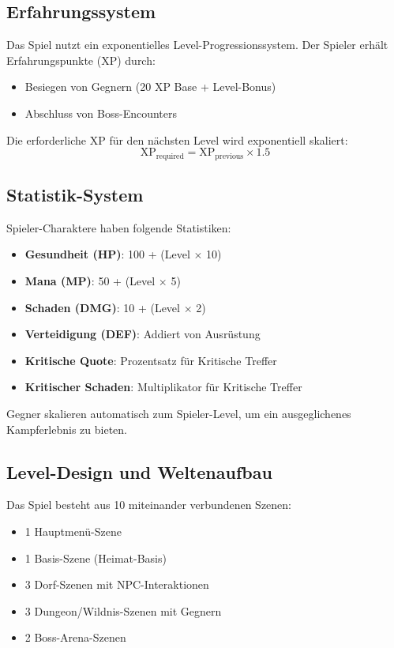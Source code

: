 \documentclass[
  a4paper,
  11pt,
  ngerman,
  parskip=half,
  bibliography=totoc,
  listof=totoc
]{scrreprt}
\begin{document}
\subsection{Erfahrungssystem}

Das Spiel nutzt ein exponentielles Level-Progressionssystem. Der Spieler erhält Erfahrungspunkte (XP) durch:
\begin{itemize}
    \item Besiegen von Gegnern (20 XP Base + Level-Bonus)
    \item Abschluss von Boss-Encounters
\end{itemize}

Die erforderliche XP für den nächsten Level wird exponentiell skaliert:
\begin{equation}
\text{XP}_{\text{required}} = \text{XP}_{\text{previous}} \times 1.5
\end{equation}

\subsection{Statistik-System}

Spieler-Charaktere haben folgende Statistiken:
\begin{itemize}
    \item \textbf{Gesundheit (HP)}: 100 + (Level $\times$ 10)
    \item \textbf{Mana (MP)}: 50 + (Level $\times$ 5)
    \item \textbf{Schaden (DMG)}: 10 + (Level $\times$ 2)
    \item \textbf{Verteidigung (DEF)}: Addiert von Ausrüstung
    \item \textbf{Kritische Quote}: Prozentsatz für Kritische Treffer
    \item \textbf{Kritischer Schaden}: Multiplikator für Kritische Treffer
\end{itemize}

Gegner skalieren automatisch zum Spieler-Level, um ein ausgeglichenes Kampferlebnis zu bieten.

\subsection{Level-Design und Weltenaufbau}

Das Spiel besteht aus 10 miteinander verbundenen Szenen:
\begin{itemize}
    \item 1 Hauptmenü-Szene
    \item 1 Basis-Szene (Heimat-Basis)
    \item 3 Dorf-Szenen mit NPC-Interaktionen
    \item 3 Dungeon/Wildnis-Szenen mit Gegnern
    \item 2 Boss-Arena-Szenen
\end{itemize}
\end{document}
